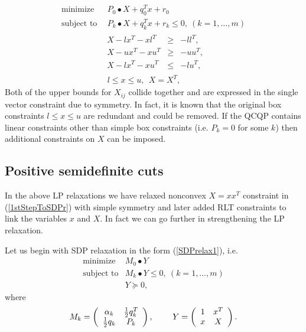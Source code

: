 \documentclass[12pt]{book}
\theoremstyle{definition}
\begin{document}
 \begin{equation}
\label{RLTrelax1} 
\begin{array}{ll}
\mbox{minimize}&\ \ P_0\bullet X + q_0^Tx + r_0\\
\mbox{subject to}&\ \ P_k\bullet X+ q_k^Tx + r_k \leq 0, \  (k = 1,\dots ,m)\\
		& \begin{array}{lcl}
		 X - lx^T - xl^T & \geq & -ll^T, \\
		 X - ux^T - xu^T & \geq & -uu^T, \\
		 X - lx^T - xu^T & \leq & -lu^T, 
		 \end{array}\\
 		&\ \ l\leq x \leq u, \ \  X = X^T,
\end{array} 
\end{equation}
Both of the upper bounds for $X_{ij}$ collide together and are expressed in the single vector constraint due to symmetry.
In fact, it is known that the original box constraints $l\leq x\leq u$ are redundant and could be removed.
If the QCQP contains linear constraints other than simple box constraints (i.e. $P_k=0$ for some $k$) then additional constraints on $X$ can be imposed.


\subsection{Positive semidefinite cuts}

In the above LP relaxations we have relaxed nonconvex $X = xx^T$ constraint in (\ref{1stStepToSDPr}) with simple symmetry and later added RLT constraints to link the variables $x$ and $X$. In fact we can go further in strengthening the LP relaxation. 

Let us begin with SDP relaxation in the form (\ref{SDPrelax1}), i.e. 
\begin{equation} 
\begin{array}{ll}
\mbox{minimize}& M_0\bullet Y \\
\mbox{subject to}& M_k\bullet Y \leq 0, \  (k = 1,\dots ,m)\\
& Y\succeq 0,
\end{array} 
\end{equation}
where 
\begin{equation}
M_k = \left(
\begin{array}{cc}
\alpha_k & {1\over 2}q_k^T \\
{1\over 2}q_k & P_k
\end{array}\right), 
\ \ \ \ \ \ \
Y =  \left(
\begin{array}{cc}
1 & x^T \\
x & X
\end{array}\right).
\end{equation}
\end{document}
